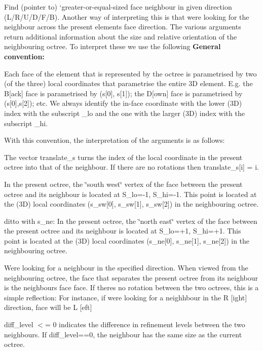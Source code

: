 Find (pointer to) `greater-\/or-\/equal-\/sized face neighbour\textquotesingle{} in given direction (L/\+R/\+U/\+D/\+F/B). Another way of interpreting this is that we\textquotesingle{}re looking for the neighbour across the present element\textquotesingle{}s face \textquotesingle{}direction\textquotesingle{}. The various arguments return additional information about the size and relative orientation of the neighbouring octree. To interpret these we use the following {\bfseries General convention\+:}
\begin{DoxyItemize}
\item Each face of the element that is represented by the octree is parametrised by two (of the three) local coordinates that parametrise the entire 3D element. E.\+g. the B\mbox{[}ack\mbox{]} face is parametrised by (s\mbox{[}0\mbox{]}, s\mbox{[}1\mbox{]}); the D\mbox{[}own\mbox{]} face is parametrised by (s\mbox{[}0\mbox{]},s\mbox{[}2\mbox{]}); etc. We always identify the in-\/face coordinate with the lower (3D) index with the subscript \+\_\+lo and the one with the larger (3D) index with the subscript \+\_\+hi.
\end{DoxyItemize}With this convention, the interpretation of the arguments is as follows\+:
\begin{DoxyItemize}
\item The vector {\ttfamily translate\+\_\+s} turns the index of the local coordinate in the present octree into that of the neighbour. If there are no rotations then {\ttfamily translate\+\_\+s}\mbox{[}i\mbox{]} = i.
\item In the present octree, the \char`\"{}south west\char`\"{} vertex of the face between the present octree and its neighbour is located at S\+\_\+lo=-\/1, S\+\_\+hi=-\/1. This point is located at the (3D) local coordinates ({\ttfamily s\+\_\+sw}\mbox{[}0\mbox{]}, {\ttfamily s\+\_\+sw}\mbox{[}1\mbox{]}, {\ttfamily s\+\_\+sw}\mbox{[}2\mbox{]}) in the neighbouring octree.
\item ditto with s\+\_\+ne\+: In the present octree, the \char`\"{}north east\char`\"{} vertex of the face between the present octree and its neighbour is located at S\+\_\+lo=+1, S\+\_\+hi=+1. This point is located at the (3D) local coordinates ({\ttfamily s\+\_\+ne}\mbox{[}0\mbox{]}, {\ttfamily s\+\_\+ne}\mbox{[}1\mbox{]}, {\ttfamily s\+\_\+ne}\mbox{[}2\mbox{]}) in the neighbouring octree.
\item We\textquotesingle{}re looking for a neighbour in the specified {\ttfamily direction}. When viewed from the neighbouring octree, the face that separates the present octree from its neighbour is the neighbour\textquotesingle{}s face {\ttfamily face}. If there\textquotesingle{}s no rotation between the two octrees, this is a simple reflection\+: For instance, if we\textquotesingle{}re looking for a neighhbour in the {\ttfamily R} \mbox{[}ight\mbox{]} {\ttfamily direction}, {\ttfamily face} will be {\ttfamily L} \mbox{[}eft\mbox{]}
\item {\ttfamily diff\+\_\+level} $<$= 0 indicates the difference in refinement levels between the two neighbours. If {\ttfamily diff\+\_\+level==0}, the neighbour has the same size as the current octree. 
\end{DoxyItemize}


